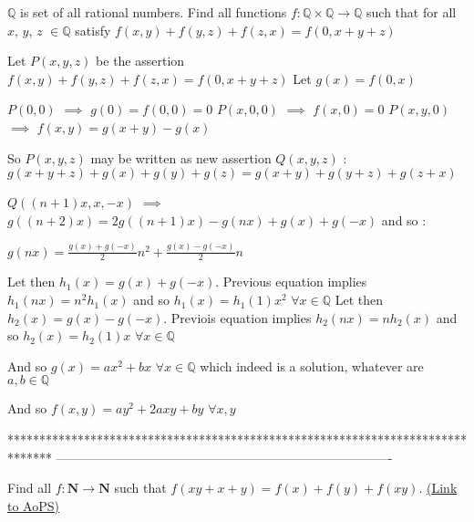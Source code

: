 \begin{solution}
	\begin{tcolorbox}$\mathbb{Q}$ is set of all rational numbers. Find all functions $f:\mathbb{Q}\times\mathbb{Q}\rightarrow\mathbb{Q}$ such that for all $x$, $y$, $z$ $\in\mathbb{Q}$  satisfy 
$f(x,y)+f(y,z)+f(z,x)=f(0,x+y+z)$\end{tcolorbox}
Let $P(x,y,z)$ be the assertion $f(x,y)+f(y,z)+f(z,x)=f(0,x+y+z)$
Let $g(x)=f(0,x)$

$P(0,0)$ $\implies$ $g(0)=f(0,0)=0$
$P(x,0,0)$ $\implies$ $f(x,0)=0$
$P(x,y,0)$ $\implies$ $f(x,y)=g(x+y)-g(x)$

So $P(x,y,z)$ may be written as new assertion $Q(x,y,z)$ : $g(x+y+z)+g(x)+g(y)+g(z)=g(x+y)+g(y+z)+g(z+x)$

$Q((n+1)x,x,-x)$ $\implies$ $g((n+2)x)=2g((n+1)x)-g(nx)+g(x)+g(-x)$ and so :

$g(nx)=\frac{g(x)+g(-x)}2n^2+\frac{g(x)-g(-x)}2n$

Let then $h_1(x)=g(x)+g(-x)$. Previous equation implies $h_1(nx)=n^2h_1(x)$ and so $h_1(x)=h_1(1)x^2$ $\forall x\in\mathbb Q$
Let then $h_2(x)=g(x)-g(-x)$. Previois equation implies $h_2(nx)=nh_2(x)$ and so $h_2(x)=h_2(1)x$ $\forall x\in\mathbb Q$

And so $g(x)=ax^2+bx$ $\forall x\in\mathbb Q$ which indeed is a solution, whatever are $a,b\in\mathbb Q$

And so $\boxed{f(x,y)=ay^2+2axy+by}$ $\forall x,y$
\end{solution}
*******************************************************************************
-------------------------------------------------------------------------------

\begin{problem}
	Find all $f:\mathbf{N} \rightarrow \mathbf{N} $ such that
$f(xy+x+y)=f(x)+f(y)+f(xy).$
	\flushright \href{https://artofproblemsolving.com/community/c6h581914}{(Link to AoPS)}
\end{problem}



